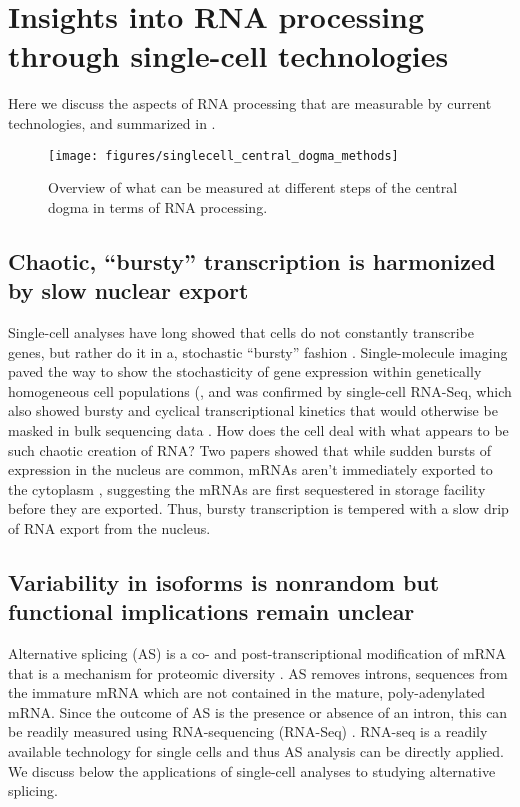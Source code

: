 \section{Insights into RNA processing through single-cell technologies}

Here we discuss the aspects of RNA processing that are measurable by current technologies, and summarized in .

\begin{figure}[h]
  \centering
  \texttt{[image: figures/singlecell\_central\_dogma\_methods]}
  \caption{Overview of what can be measured at different steps of the central dogma in terms of RNA processing.}
\label{fig:singlecell_central_dogma_methods}
\end{figure}


\subsection{Chaotic, ``bursty'' transcription is harmonized by slow nuclear export}

Single-cell analyses have long showed that cells do not constantly transcribe genes, but rather do it in a, stochastic ``bursty'' fashion  \cite{Kaern2005-ca,Kaufmann2007-nh,Raj2008-er,Raj2006-vi}. Single-molecule imaging paved the way to show the stochasticity of gene expression within genetically homogeneous cell populations \cite{Raj2006-vi,Vargas2011-iq} (, and was confirmed by single-cell RNA-Seq, which also showed bursty and cyclical transcriptional kinetics that would otherwise be masked in bulk sequencing data  \cite{Buettner2015-mj,Livak2013-nv,Shalek2013-ez}. How does the cell deal with what appears to be such chaotic creation of RNA? Two papers showed that while sudden bursts of expression in the nucleus are common, mRNAs aren't immediately exported to the cytoplasm  \cite{Bahar_Halpern2015-dq,Battich2015-df}, suggesting the mRNAs are first sequestered in storage facility before they are exported. Thus, bursty transcription is tempered with a slow drip of RNA export from the nucleus.


\subsection{Variability in isoforms is nonrandom but functional implications remain unclear}

Alternative splicing (AS) is a co- and post-transcriptional modification of mRNA that is a mechanism for proteomic diversity  \cite{Ameur2011-wf,Black2003-fz,Caceres2002-el,Day2016-ej,Kornblihtt2013-gm,Lee2015-vi}. AS removes introns, sequences from the immature mRNA which are not contained in the mature, poly-adenylated mRNA. Since the outcome of AS is the presence or absence of an intron, this can be readily measured using RNA-sequencing (RNA-Seq)  \cite{Wang2008-xh}. RNA-seq is a readily available technology for single cells and thus AS analysis can be directly applied. We discuss below the applications of single-cell analyses to studying alternative splicing.

